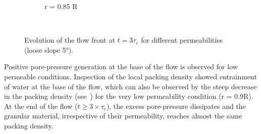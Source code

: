 \begin{figure}
{\begin{subfigure}[b]{0.95\textwidth}
    \caption{r = 0.85 R}
    \label{fig:LBM_660_Slope5_r085}
\end{subfigure}
}\\
\caption{Evolution of the flow front at $t = 3\tau_c$ for different 
permeabilities (loose slope 5\si{\degree}).}
\label{fig:slope_loose_5}
\end{figure}

Positive pore-pressure generation at the base of the flow is observed for low 
permeable conditions. Inspection of the local packing density showed 
entrainment of water at the base of the flow, which can also be observed by the 
steep decrease in the packing density (see~) for the very low 
permeability condition (r = 0.9R). At the end of the flow ($t \ge 3 \times 
\tau_c$), the excess pore-pressure dissipates and the granular material, 
irrespective of their permeability, reaches almost the same packing density.



